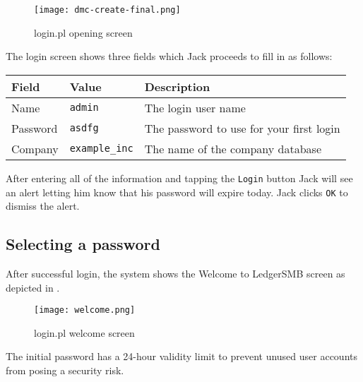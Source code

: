 \begin{figure}[h]
\centering
\texttt{[image: dmc-create-final.png]}
\caption{login.pl opening screen}
\label{fig:login-screen}
\end{figure}

The login screen shows three fields which Jack proceeds to fill in as follows:

\begin{longtable}{ llp{6cm} }
        Field & Value & Description \\ \hline
        \endhead
        Name & \texttt{admin} & The login user name\\
        Password & \texttt{asdfg} & The password to use for your first login\\
        Company & \texttt{example\_inc} & The name of the company database \\
\end{longtable}


After entering all of the information and tapping the \texttt{Login} button Jack will see an alert letting
him know that his password will expire today.  Jack clicks \texttt{OK} to dismiss the alert.

\subsection{Selecting a password}
\label{subsec-first-login-password}

After successful login, the system shows the Welcome to LedgerSMB  screen as depicted in
.

\begin{figure}[h]
        \centering
        \texttt{[image: welcome.png]}
        \caption{login.pl welcome screen}
        \label{fig:login-welcome-screen}
\end{figure}

The
initial password has a 24-hour validity limit to prevent unused user accounts from posing
a security risk.  

